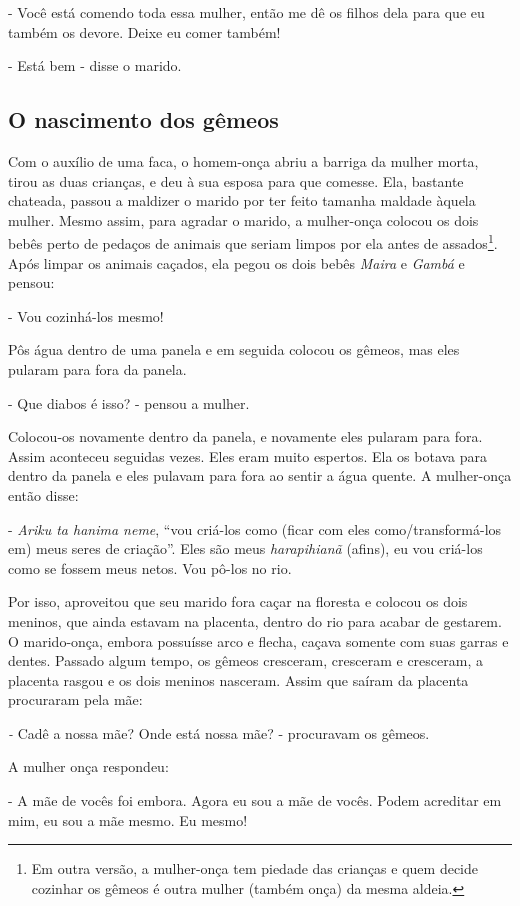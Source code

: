 - Você está comendo toda essa mulher, então me dê os filhos dela para
que eu também os devore. Deixe eu comer também!

- Está bem - disse o marido.

\subsection{O nascimento dos gêmeos}

Com o auxílio de uma faca, o homem-onça abriu a barriga da mulher morta,
tirou as duas crianças, e deu à sua esposa para que comesse. Ela,
bastante chateada, passou a maldizer o marido por ter feito tamanha
maldade àquela mulher. Mesmo assim, para agradar o marido, a mulher-onça
colocou os dois bebês perto de pedaços de animais que seriam limpos por
ela antes de assados\footnote{Em outra versão, a mulher-onça tem piedade
  das crianças e quem decide cozinhar os gêmeos é outra mulher (também
  onça) da mesma aldeia.}. Após limpar os animais caçados, ela pegou os
dois bebês \emph{Maira} e \emph{Gambá} e pensou:

- Vou cozinhá-los mesmo!

Pôs água dentro de uma panela e em seguida colocou os gêmeos, mas eles
pularam para fora da panela.

- Que diabos é isso? - pensou a mulher.

Colocou-os novamente dentro da panela, e novamente eles pularam para
fora. Assim aconteceu seguidas vezes. Eles eram muito espertos. Ela os
botava para dentro da panela e eles pulavam para fora ao sentir a água
quente. A mulher-onça então disse:

- \emph{Ariku ta hanima neme}, ``vou criá-los como (ficar com eles
como/transformá-los em) meus seres de criação''. Eles são meus
\emph{harapihianã} (afins), eu vou criá-los como se fossem meus netos.
Vou pô-los no rio.

Por isso, aproveitou que seu marido fora caçar na floresta e colocou os
dois meninos, que ainda estavam na placenta, dentro do rio para acabar
de gestarem. O marido-onça, embora possuísse arco e flecha, caçava
somente com suas garras e dentes. Passado algum tempo, os gêmeos
cresceram, cresceram e cresceram, a placenta rasgou e os dois meninos
nasceram. Assim que saíram da placenta procuraram pela mãe:

\emph{-} Cadê a nossa mãe? Onde está nossa mãe? - procuravam os gêmeos.

A mulher onça respondeu:

- A mãe de vocês foi embora. Agora eu sou a mãe de vocês. Podem
acreditar em mim, eu sou a mãe mesmo. Eu mesmo!

